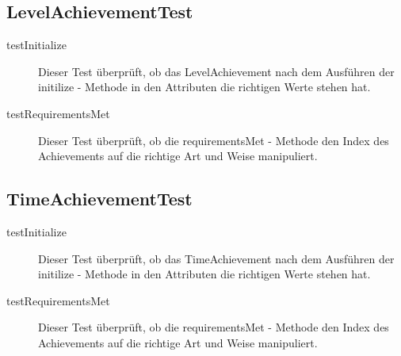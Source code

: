 \subsection{LevelAchievementTest}

\begin{description}
\item[testInitialize]
Dieser Test überprüft, ob das LevelAchievement nach dem Ausführen der initilize - Methode in den Attributen die richtigen Werte stehen hat.

\item[testRequirementsMet]
Dieser Test überprüft, ob die requirementsMet - Methode den Index des Achievements auf die richtige Art und Weise manipuliert.

\end{description}


\subsection{TimeAchievementTest}

\begin{description}
\item[testInitialize]
Dieser Test überprüft, ob das TimeAchievement nach dem Ausführen der initilize - Methode in den Attributen die richtigen Werte stehen hat.

\item[testRequirementsMet]
Dieser Test überprüft, ob die requirementsMet - Methode den Index des Achievements auf die richtige Art und Weise manipuliert.

\end{description}

